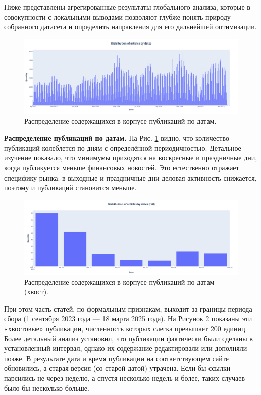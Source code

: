 Ниже представлены агрегированные результаты глобального анализа, которые в совокупности с локальными выводами
позволяют глубже понять природу собранного датасета и определить направления для его дальнейшей оптимизации.

\begin{figure}[H]
    \centering
    \includegraphics[width=1\linewidth]{img/articles_dist_by_dates.png}
    \caption{Распределение содержащихся в корпусе публикаций по датам.}
    \label{fig:dist_by_dates}
\end{figure}

\textbf{Распределение публикаций по датам.} На Рис. \ref{fig:dist_by_dates} видно, что количество публикаций
колеблется по дням с определённой периодичностью. Детальное изучение показало, что минимумы приходятся
на воскресные и праздничные дни, когда публикуется меньше финансовых новостей. Это естественно отражает
специфику рынка: в выходные и праздничные дни деловая активность снижается, поэтому и публикаций становится меньше.

\begin{figure}[H]
    \centering
    \includegraphics[width=1\linewidth]{img/articles_dist_by_dates_tail.png}
    \caption{\label{fig:dist_by_dates_tail}Распределение содержащихся в корпусе публикаций по датам (хвост).}
\end{figure}

При этом часть статей, по формальным признакам, выходит за границы периода сбора (1 сентября 2023 года --- 18 марта 2025 года).
На Рисунок \ref{fig:dist_by_dates_tail} показаны эти «хвостовые» публикации, численность которых слегка превышает 200 единиц.
Более детальный анализ установил, что публикации фактически были сделаны в установленный интервал, однако их содержание
редактировали или дополняли позже. В результате дата и время публикации на соответствующем сайте обновились, а старая версия
(со старой датой) утрачена. Если бы ссылки парсились не через неделю, а спустя несколько недель и более, таких случаев было
бы несколько больше.


